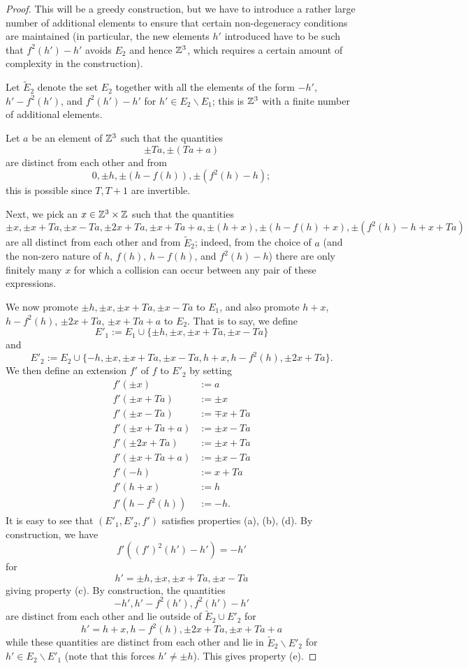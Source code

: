 \begin{proof} This will be a greedy construction, but we have to introduce a rather large number of additional elements to ensure that certain non-degeneracy conditions are maintained (in particular, the new elements $h'$ introduced have to be such that $f^2(h') - h'$ avoids $E_2$ and hence $\mathbb{Z}^3$, which requires a certain amount of complexity in the construction).

  Let $\tilde E_2$ denote the set $E_2$ together with all the elements of the form $-h'$, $h' - f^2(h')$, and $f^2(h') - h'$ for $h' \in E_2 \backslash E_1$; this is $\mathbb{Z}^3$ with a finite number of additional elements.

Let $a$ be an element of $\mathbb{Z}^3$ such that the quantities
$$ \pm Ta, \pm(Ta + a)$$
are distinct from each other and from
$$0, \pm h, \pm (h - f(h)), \pm (f^2(h)-h);$$
this is possible since $T, T+1$ are invertible.

Next, we pick an $x \in \mathbb{Z}^3 \times \mathbb{Z}$ such that the quantities
$$ \pm x, \pm x + Ta, \pm x - Ta, \pm 2 x + Ta, \pm x + Ta + a, \pm (h + x), \pm (h - f(h) + x), \pm (f^2(h)-h + x + Ta)$$
are all distinct from each other and from $\tilde E_2$; indeed, from the choice of $a$ (and the non-zero nature of $h$, $f(h)$, $h-f(h)$, and $f^2(h)-h$) there are only finitely many $x$ for which a collision can occur between any pair of these expressions.

We now promote $\pm h, \pm x, \pm x + Ta, \pm x - Ta$ to $E_1$, and also promote $h+x$, $h - f^2(h)$, $\pm 2x + Ta$, $\pm x + Ta + a$ to $E_2$.  That is to say, we define
$$ E'_1 := E_1 \cup \{\pm h, \pm x, \pm x + Ta, \pm x - Ta\}$$
and
$$ E'_2 := E_2 \cup \{ -h, \pm x, \pm x + Ta, \pm x - Ta, h + x, h - f^2(h), \pm 2x + Ta \}.$$
We then define an extension $f'$ of $f$ to $E'_2$ by setting
\begin{align*}
 f'(\pm x) &:= a \\
 f'(\pm x + Ta) &:= \pm x \\
 f'(\pm x - Ta) &:= \mp x + Ta \\
 f'(\pm x + Ta + a) &:= \pm x - Ta \\
 f'(\pm 2x + Ta) &:= \pm x + Ta \\
 f'(\pm x + Ta + a) &:= \pm x - Ta \\
 f'(-h) &:= x + Ta \\
 f'(h+x) &:= h \\
 f'(h - f^2(h)) &:= -h.
\end{align*}
It is easy to see that $(E'_1,E'_2,f')$ satisfies properties (a), (b), (d).  By construction, we have
$$ f'( (f')^2(h') - h') = -h'$$
for
$$ h' = \pm h, \pm x, \pm x+Ta, \pm x-Ta$$
giving property (c).  By construction, the quantities
$$ -h', h' - f^2(h'), f^2(h') - h'$$
are distinct from each other and lie outside of $\tilde E_2 \cup E'_2$ for
$$ h' = h+x, h - f^2(h), \pm 2x + Ta, \pm x + Ta + a$$
while these quantities are distinct from each other and lie in $\tilde E_2 \backslash E'_2$ for $h' \in E_2 \backslash E'_1$ (note that this forces $h' \neq \pm h$).  This gives property (e).
\end{proof}


